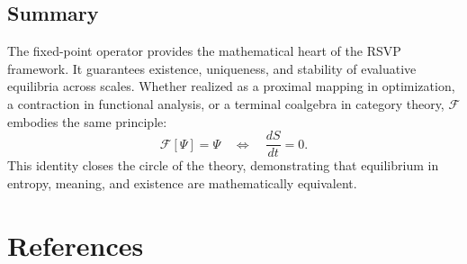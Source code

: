 \documentclass[12pt,a4paper]{article}
\newcommand{\F}{\mathcal{F}}          %
\theoremstyle{plain}
\begin{document}
\subsection{Summary}
The fixed-point operator provides the mathematical heart of the RSVP framework.
It guarantees existence, uniqueness, and stability of evaluative equilibria across scales.
Whether realized as a proximal mapping in optimization, a contraction in functional analysis, or a terminal coalgebra in category theory, 
\(\mathcal{F}\) embodies the same principle:
\[
\F[\Psi]=\Psi
\quad\Longleftrightarrow\quad
\frac{dS}{dt}=0.
\]
This identity closes the circle of the theory, demonstrating that equilibrium in entropy, meaning, and existence are mathematically equivalent.



\clearpage
{}
{}
\section*{References}
\end{document}
